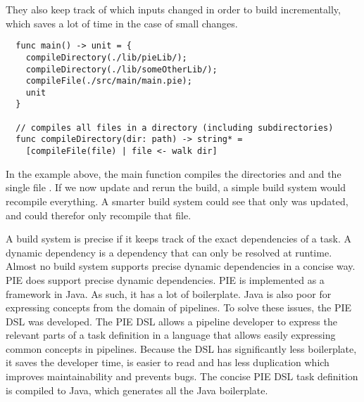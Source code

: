 They also keep track of which inputs changed in order to build incrementally, which saves a lot of time in the case of small changes.
\begin{lstlisting}
  func main() -> unit = {
    compileDirectory(./lib/pieLib/);
    compileDirectory(./lib/someOtherLib/);
    compileFile(./src/main/main.pie);
    unit
  }

  // compiles all files in a directory (including subdirectories)
  func compileDirectory(dir: path) -> string* =
    [compileFile(file) | file <- walk dir]
\end{lstlisting}
In the example above, the main function compiles the directories  and  and the single file .
If we now update  and rerun the build, a simple build system would recompile everything.
A smarter build system could see that only  was updated, and could therefor only recompile that file.


A build system is precise if it keeps track of the exact dependencies of a task.
A dynamic dependency is a dependency that can only be resolved at runtime.
Almost no build system supports precise dynamic dependencies in a concise way.
\Ac{PIE} does support precise dynamic dependencies.
\Ac{PIE} is implemented as a framework in Java.
As such, it has a lot of boilerplate.
Java is also poor for expressing concepts from the domain of pipelines.
To solve these issues, the \ac{PIE} \ac{DSL} was developed.
The \ac{PIE} \ac{DSL} allows a pipeline developer to express the relevant parts of a task definition in a language that allows easily expressing common concepts in pipelines.
Because the \ac{DSL} has significantly less boilerplate, it saves the developer time, is easier to read and has less duplication which improves maintainability and prevents bugs. 
The concise \ac{PIE} \ac{DSL} task definition is compiled to Java, which generates all the Java boilerplate.

